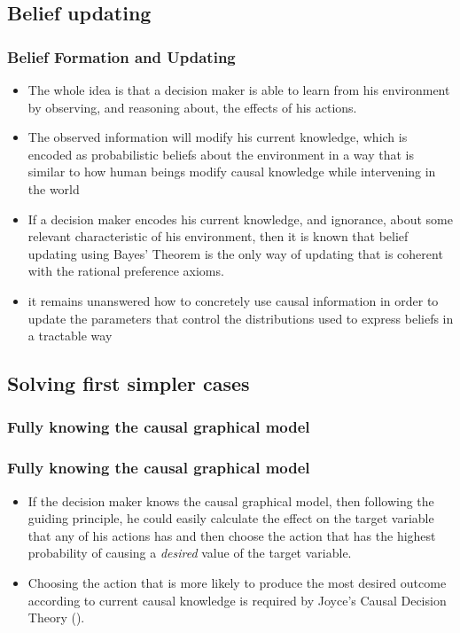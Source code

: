 \documentclass{beamer}
\theoremstyle{plain}
\begin{document}
\subsection{Belief updating}
\begin{frame}
\frametitle{Belief Formation and Updating}
\begin{itemize}
\item The whole idea is that a decision maker is able to learn from his environment by observing, and reasoning about, the effects of his actions.
\item The observed information will modify his current knowledge, which is encoded as probabilistic beliefs about the environment in a way that is similar to how human beings modify causal knowledge while intervening in the world
\item If a decision maker encodes his current knowledge, and ignorance, about some relevant characteristic of his environment, then it is known that belief updating using Bayes' Theorem is the only way of updating that is coherent with the rational preference axioms.
\item it remains unanswered how to concretely use causal information in order to update the parameters that control the distributions used to express beliefs in a tractable way
\end{itemize}
\end{frame}

\subsection{Solving first simpler cases}
\subsubsection{Fully knowing the causal graphical model}
\begin{frame}
\frametitle{Fully knowing the causal graphical model}
\begin{itemize}
\item If the decision maker knows the causal graphical model, then following the guiding principle, he could easily calculate the effect on the target variable that any of his actions has and then choose the action that has the highest probability of causing a \textit{desired} value of the target variable.
\item Choosing the action that is more likely to produce the most desired outcome according to current causal knowledge is required by Joyce's Causal Decision Theory (\cite{joyce1999foundations}).
\end{itemize}
\end{frame}
\end{document}
